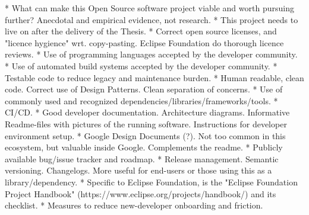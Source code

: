 * What can make this Open Source software project viable and worth pursuing further? Anecdotal and empirical evidence, not research.
  * This project needs to live on after the delivery of the Thesis.
  * Correct open source licenses, and "licence hygience" wrt. copy-pasting. Eclipse Foundation do thorough licence reviews.
  * Use of programming languages accepted by the developer community.
  * Use of automated build systems accepted by the developer community.
  * Testable code to reduce legacy and maintenance burden.
  * Human readable, clean code. Correct use of Design Patterns. Clean separation of concerns.
  * Use of commonly used and recognized dependencies/libraries/frameworks/tools.
  * CI/CD.
  * Good developer documentation. Architecture diagrams. Informative Readme-files with pictures of the running software. Instructions for developer environment setup.
  * Google Design Documents (?). Not too common in this ecosystem, but valuable inside Google. Complements the readme.
  * Publicly available bug/issue tracker and roadmap.
  * Release management. Semantic versioning. Changelogs. More useful for end-users or those using this as a library/dependency.
  * Specific to Eclipse Foundation, is the "Eclipse Foundation Project Handbook" (https://www.eclipse.org/projects/handbook/) and its checklist.
  * Measures to reduce new-developer onboarding and friction.
